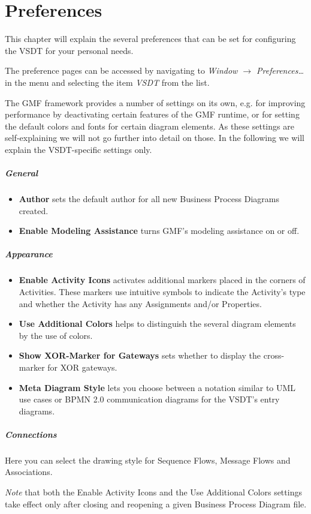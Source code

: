 \chapter{Preferences}
\label{sec:user_preferences}

This chapter will explain the several preferences that can be set for configuring
the VSDT for your personal needs.

The preference pages can be accessed by navigating to \emph{Window $\rightarrow$
Preferences\dots} in the menu and selecting the item \emph{VSDT} from the list.

The GMF framework provides a number of settings on its own, e.g. for improving
performance by deactivating certain features of the GMF runtime, or for setting
the default colors and fonts for certain diagram elements.  As these settings are
self-explaining we will not go further into detail on those.  In the following we
will explain the VSDT-specific settings only.

\paragraph{General}
\begin{itemize}
	\item \textbf{Author} sets the default author for all new Business Process
	Diagrams created.
	
	\item \textbf{Enable Modeling Assistance} turns GMF's modeling assistance on
	or off.
\end{itemize}	

\paragraph{Appearance}
\begin{itemize}
	\item \textbf{Enable Activity Icons} activates additional markers placed in
	the corners of Activities.  These markers use intuitive symbols to indicate
	the Activity's type and whether the Activity has any Assignments and/or
	Properties.
	
	\item \textbf{Use Additional Colors} helps to distinguish the several diagram
	elements by the use of colors.
	
	\item \textbf{Show XOR-Marker for Gateways} sets whether to display the
	cross-marker for XOR gateways.
	
	\item \textbf{Meta Diagram Style} lets you choose between a notation similar
	to UML use cases or BPMN 2.0 communication diagrams for the VSDT's entry
	diagrams.
\end{itemize}

\paragraph{Connections}
Here you can select the drawing style for Sequence Flows, Message Flows and
Associations.

\emph{Note} that both the Enable Activity Icons and the Use Additional Colors
settings take effect only after closing and reopening a given Business Process
Diagram file.

